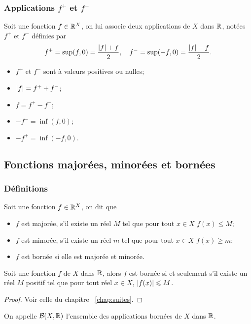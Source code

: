 \subsubsection{Applications \(f^+\) et \(f^-\)}

\begin{defdef}
  Soit une fonction \(f \in \mathbb{R}^X\), on lui associe deux applications de \(X\) dans \(\mathbb{R}\), notées \(f^+\) et \(f^-\) définies par
  \begin{equation}
    f^+=\sup(f,0)=\frac{\left\lvert f\right\rvert+f}{2}, \quad f^-=\sup(-f,0)=\frac{\left\lvert f\right\rvert-f}{2}.
  \end{equation}
\end{defdef}
\begin{prop}[Propriétés]
  \begin{itemize}
  \item \(f^+\) et \(f^-\) sont à valeurs positives ou nulles;
  \item \(\left\lvert f\right\rvert=f^++f^-\);
  \item \(f=f^+-f^-\);
  \item \(-f^-=\inf(f,0)\);
  \item \(-f^+=\inf(-f,0)\).
  \end{itemize}
\end{prop}

\subsection{Fonctions majorées, minorées et bornées}

\subsubsection{Définitions}
\begin{defdef}
  Soit une fonction \(f \in \mathbb{R}^X\), on dit que
  \begin{itemize}
  \item \(f\) est majorée, s'il existe un réel \(M\) tel que pour tout \(x \in X\) \(f(x) \leqslant M\);
  \item \(f\) est minorée, s'il existe un réel \(m\) tel que pour tout \(x \in X\) \(f(x) \geqslant m\);
  \item \(f\) est bornée si elle est majorée et minorée.
  \end{itemize}
\end{defdef}
\begin{prop}
  Soit une fonction \(f\) de \(X\) dans \(\mathbb{R}\), alors \(f\) est bornée si et seulement s'il existe un réel \(M\) positif tel que pour tout réel \(x \in X\), \(\left\lvert f(x)\right\rvert \leqslant M\).
\end{prop}
\begin{proof}
  Voir celle du chapitre~
\ref{chap:suites}.
\end{proof}
\begin{defdef}
  On appelle \(\mathcal{B}(X,\mathbb{R})\) l'ensemble des applications bornées de \(X\) dans \(\mathbb{R}\).
\end{defdef}

